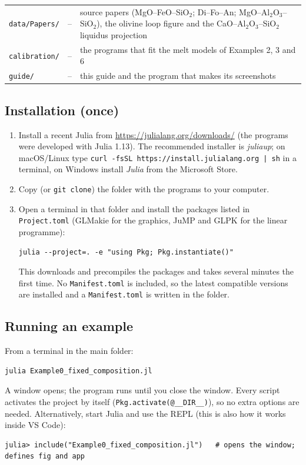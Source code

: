\documentclass[11pt,a4paper]{article}
\newcommand{\file}[1]{\texttt{#1}}
\begin{document}
\begin{table}[H]
\begin{tabular}{@{}ll>{\raggedright\arraybackslash}p{6.9cm}@{}}
\file{data/Papers/}                      & --            & source papers (MgO–FeO–SiO$_2$; Di–Fo–An; MgO–Al$_2$O$_3$–SiO$_2$), the olivine loop figure and the CaO–Al$_2$O$_3$–SiO$_2$ liquidus projection \\
\file{calibration/}                      & --            & the programs that fit the melt models of Examples 2, 3 and 6 \\
\file{guide/}                            & --            & this guide and the program that makes its screenshots \\
\bottomrule
\end{tabular}
\end{table}

\subsection{Installation (once)}
\begin{enumerate}
\item Install a recent Julia from \url{https://julialang.org/downloads/} (the programs were developed with
  Julia 1.13). The recommended
  installer is \emph{juliaup}; on macOS/Linux type
  \lstinline{curl -fsSL https://install.julialang.org | sh} in a terminal, on Windows install
  \emph{Julia} from the Microsoft Store.
\item Copy (or \texttt{git clone}) the folder with the programs to your computer.
\item Open a terminal in that folder and install the packages listed in \file{Project.toml}
  (GLMakie for the graphics, JuMP and GLPK for the linear programme):
\begin{lstlisting}
julia --project=. -e "using Pkg; Pkg.instantiate()"
\end{lstlisting}
  This downloads and precompiles the packages and takes several minutes the first time. No
  \file{Manifest.toml} is included, so the latest compatible versions are installed and a
  \file{Manifest.toml} is written in the folder.
\end{enumerate}

\subsection{Running an example}
From a terminal in the main folder:
\begin{lstlisting}
julia Example0_fixed_composition.jl
\end{lstlisting}
A window opens; the program runs until you close the window. Every script activates the project by itself
(\lstinline{Pkg.activate(@__DIR__)}), so no extra options are needed. Alternatively, start Julia and use the
REPL (this is also how it works inside VS Code):
\begin{lstlisting}
julia> include("Example0_fixed_composition.jl")   # opens the window; defines fig and app
\end{lstlisting}
\end{document}
